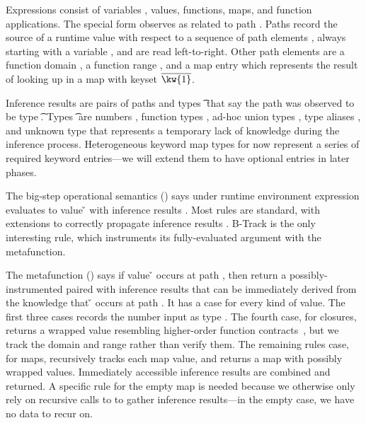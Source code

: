 Expressions \e{} consist of variables \x{}, values,
functions, maps, and function applications.
The special form
\trackE{\e{}}{\inferpath{}}
observes {\e{}} as related to path {\inferpath{}}.
Paths \inferpath{} 
record the source of a runtime value with respect
to a sequence of path elements \inferpth{}, always starting with
a variable \x{}, and are read left-to-right.
Other path elements are
a function domain \dompe{}, 
a function range \rngpe{},
and a map entry {}
which represents the result of looking up {}
in a map with keyset ${\ova{\kw{1}}}$.

Inference results \restwoarrow{\inferpath{}}{\t{}}
are pairs of paths {\inferpath{}} and types \t{}
that say the path \inferpath{} was observed to be 
type \t{}.
Types \t{} are numbers \IntT{}, function types \arrow{\t{}}{\t{}},
ad-hoc union types \Union{\t{}}{\t{}},
type aliases \alias{},
and unknown type \UnknownT{} that represents
a temporary lack of knowledge during the inference process.
Heterogeneous keyword map types \HMappretty{\ova{\kw{}\ \t{}}}
for now represent a series of required keyword entries---we will extend
them to have optional entries in later phases.

The big-step operational semantics
{\opsemtrack{\openv{}}{\e{}}{\v{}}{\res{}}}
()
says under runtime environment \openv{}
expression \e{} evaluates to value \v{}
with inference results \res{}.
Most rules are standard, with extensions to correctly
propagate inference results \res{}.
B-Track is the only interesting rule, which instruments
its fully-evaluated argument with the \trackmetaOp{}
metafunction.

The metafunction \trackmeta{\v{}}{\inferpath{}}{\vp{}}{\res{}} ()
says if value \v{} occurs at path {\inferpath{}}, then return a possibly-instrumented
\vp{} paired with inference results {\res{}} that can be immediately derived
from the knowledge that \v{} occurs at path {\inferpath{}}.
It has a case for every kind of value.
The first three cases records the number input as type {\IntT{}}.
The fourth case, for closures, returns a wrapped value
resembling higher-order function contracts~\cite{findler2002contracts},
but we track the domain and range rather than verify them.
The remaining rules case, for maps, recursively tracks each map value,
and returns a map with possibly wrapped values.
Immediately accessible inference results are combined
and returned.
A specific rule for the empty map is needed because we otherwise only rely on
recursive calls to \trackEOp{} to gather inference results---in the empty case,
we have no data to recur on.

